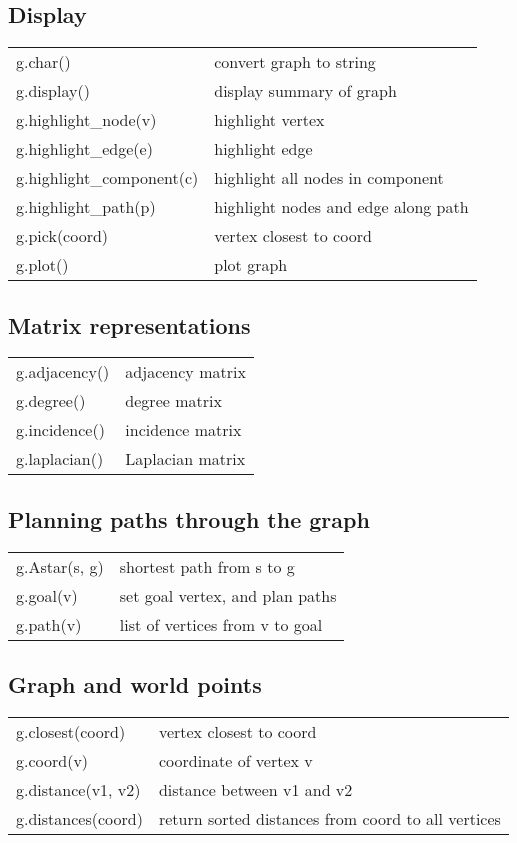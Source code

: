 \subsection*{Display}
\begin{longtable}{lp{120mm}}
g.char() & convert graph to string\\ 
g.display() & display summary of graph\\ 
g.highlight\_node(v) & highlight vertex\\ 
g.highlight\_edge(e) & highlight edge\\ 
g.highlight\_component(c) & highlight all nodes in component\\ 
g.highlight\_path(p) & highlight nodes and edge along path\\ 
g.pick(coord) & vertex closest to coord\\ 
g.plot() & plot graph\\ 
\end{longtable}\vspace{1ex}

\subsection*{Matrix representations}
\begin{longtable}{lp{120mm}}
g.adjacency() & adjacency matrix\\ 
g.degree() & degree matrix\\ 
g.incidence() & incidence matrix\\ 
g.laplacian() & Laplacian  matrix\\ 
\end{longtable}\vspace{1ex}

\subsection*{Planning paths through the graph}
\begin{longtable}{lp{120mm}}
g.Astar(s, g) & shortest path from s to g\\ 
g.goal(v) & set goal vertex, and plan paths\\ 
g.path(v) & list of vertices from v to goal\\ 
\end{longtable}\vspace{1ex}

\subsection*{Graph and world points}
\begin{longtable}{lp{120mm}}
g.closest(coord) & vertex closest to coord\\ 
g.coord(v) & coordinate of vertex v\\ 
g.distance(v1, v2) & distance between v1 and v2\\ 
g.distances(coord) & return sorted distances from coord to all vertices\\ 
\end{longtable}\vspace{1ex}

